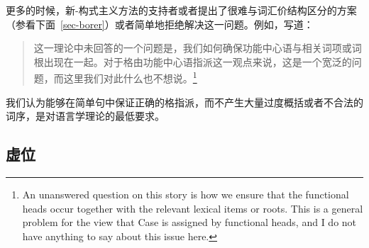 \begin{exe}
\begin{xlist}[iv.]
\begin{exe}
\begin{xlist}[iv.]
更多的时候，新-构式主义方法的支持者或者提出了很难与词汇价结构区分的方案（参看下面~\ref{sec-borer}）或者简单地拒绝解决这一问题。例如，\citet{Lohndal2012a}写道：
\begin{quote}
这一理论中未回答的一个问题是，我们如何确保功能中心语与相关词项或词根出现在一起。对于格由功能中心语指派这一观点来说，这是一个宽泛的问题，而这里我们对此什么也不想说。\citep{Lohndal2012a}\footnote{%
An unanswered question on this story is how we ensure that the functional heads occur together with
the relevant lexical items or roots. This is a general problem for the view that Case is assigned by
functional heads, and I do not have anything to say about this issue here.
}
\end{quote}
我们认为能够在简单句中保证正确的格指派，而不产生大量过度概括或者不合法的词序，是对语言学理论的最低要求。

\subsection{虚位}
\label{sec-expletives}


\end{xlist}
\end{exe}
\end{xlist}
\end{exe}
